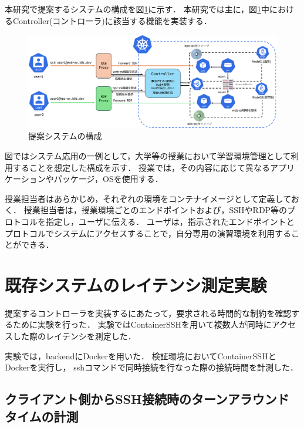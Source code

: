 \documentclass[dvipdfmx]{cs-handout}
\begin{document}
本研究で提案するシステムの構成を図\ref{fig:system}に示す．
本研究では主に，図\ref{fig:system}中におけるController(コントローラ)に該当する機能を実装する．
%
\begin{figure}[htbp]
\includegraphics[width=\linewidth]{./fig/system.png}
\caption{提案システムの構成}
\label{fig:system}
\end{figure}
%
図ではシステム応用の一例として，大学等の授業において学習環境管理として利用することを想定した構成を示す．
授業では，その内容に応じて異なるアプリケーションやパッケージ，OSを使用する．

授業担当者はあらかじめ，それぞれの環境をコンテナイメージとして定義しておく．
授業担当者は，授業環境ごとのエンドポイントおよび，SSHやRDP等のプロトコルを指定し，ユーザに伝える．
ユーザは，指示されたエンドポイントとプロトコルでシステムにアクセスすることで，自分専用の演習環境を利用することができる．

\section{既存システムのレイテンシ測定実験}

提案するコントローラを実装するにあたって，要求される時間的な制約を確認するために実験を行った．
実験ではContainerSSHを用いて複数人が同時にアクセスした際のレイテンシを測定した．

実験では，backendにDockerを用いた．
検証環境においてContainerSSHとDockerを実行し， sshコマンドで同時接続を行なった際の接続時間を計測した．

\subsection{クライアント側からSSH接続時のターンアラウンドタイムの計測}
\end{document}
